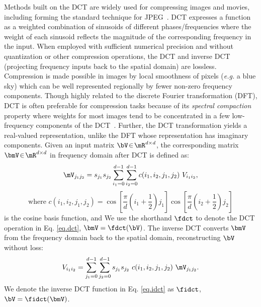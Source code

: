 \documentclass{article} %
\begin{document}
\label{sec:dct}%
Methods built on the DCT are widely used for compressing images and movies, including forming the standard technique for JPEG~\cite{wallace1991jpeg}.
DCT expresses a function as a weighted combination of sinusoids of different phases/frequencies where the weight of each sinusoid reflects the magnitude of the corresponding frequency in the input.
When employed with sufficient numerical precision and without quantization or other compression operations, the DCT and inverse DCT (projecting frequency inputs back to the spatial domain) are lossless.
Compression is made possible in images by local smoothness of pixels (\emph{e.g.} a blue sky) which can be well represented regionally by fewer non-zero frequency components.
Though highly related to the discrete Fourier transformation (DFT), DCT is often preferable for compression tasks because of its \emph{spectral compaction} property where weights for most images tend to be concentrated in a few low-frequency components of the DCT~\cite{rao2014discrete}.
Further, the DCT transformation yields a real-valued representation, unlike the DFT whose representation has imaginary components. 
Given an input matrix $\bV\!\in\! \mR^{d\times d}$, the corresponding matrix $\bmV\!\in\! \mR^{d\times d}$ in frequency domain after DCT is defined as:
\begin{equation}
	\mV_{j_1 j_2} = s_{j_1} s_{j_2} \sum_{i_1=0}^{d-1} \sum_{i_2=0}^{d-1} c(i_1,i_2,j_1,j_2)\ V_{i_1 i_2},
	\label{eq.dct}
\end{equation}\begin{equation*}
    \textrm{where\ \ \ } c(i_1,i_2,j_1,j_2) =  \cos{\left[\frac{\pi}{d} \left(i_1+\frac{1}{2}\right)j_1 \right]} 
	\cos{\left[\frac{\pi}{d} \left(i_2+\frac{1}{2}\right)j_2 \right]}
\end{equation*}
is the cosine basis function, and
We use the shorthand $\fdct$ to denote the DCT operation in Eq. \eqref{eq.dct}, \ie{}$\bmV=\fdct(\bV)$. The inverse DCT converts $\bmV$ from the frequency domain back to the spatial domain, reconstructing $\bV$ without loss:
\begin{equation}
	V_{i_1 i_2} = \sum_{j_1=0}^{d-1}  \sum_{j_2=0}^{d-1} s_{j_1} s_{j_2}\ c(i_1,i_2,j_1,j_2)\ \mV_{j_1 j_2}.
	\label{eq.idct}
\end{equation}
We denote the inverse DCT function in Eq. \eqref{eq.idct} as $\fidct$, \ie{}$\bV = \fidct(\bmV)$. 
\end{document}
